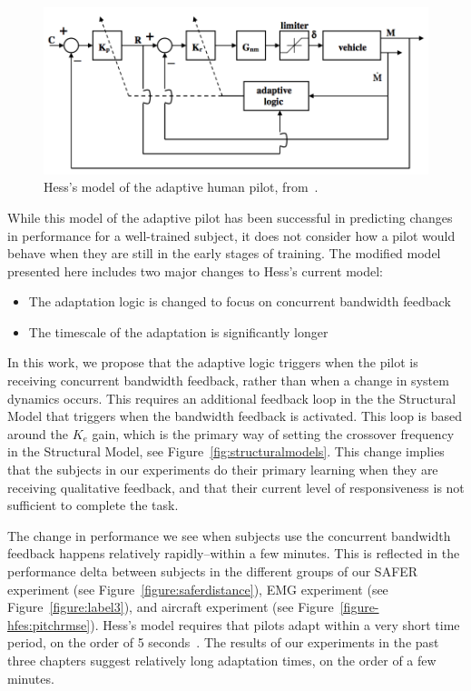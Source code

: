 \begin{figure}[tb]
    \begin{center}
        \includegraphics[width=0.8\linewidth]{figures/Modeling/Screen_Shot_2018-08-09_at_4_15_24_PM.png}
        \caption[Hess's model of the adaptive human pilot]{Hess's model of the adaptive human pilot, from~\citet{hess_modeling_2009}.}
        \label{figure:hesspursuit}
    \end{center}
\end{figure}

While this model of the adaptive pilot has been successful in predicting changes in performance for a well-trained subject, it does not consider how a pilot would behave when they are still in the early stages of training.
The modified model presented here includes two major changes to Hess's current model:
\begin{itemize}
    \item The adaptation logic is changed to focus on concurrent bandwidth feedback
    \item The timescale of the adaptation is significantly longer
\end{itemize}

In this work, we propose that the adaptive logic triggers when the pilot is receiving concurrent bandwidth feedback, rather than when a change in system dynamics occurs.
This requires an additional feedback loop in the the Structural Model that triggers when the bandwidth feedback is activated.
This loop is based around the $K_e$ gain, which is the primary way of setting the crossover frequency in the Structural Model, see Figure~\ref{fig:structuralmodels}.
This change implies that the subjects in our experiments do their primary learning when they are receiving qualitative feedback, and that their current level of responsiveness is not sufficient to complete the task.

The change in performance we see when subjects use the concurrent bandwidth feedback happens relatively rapidly--within a few minutes.
This is reflected in the performance delta between subjects in the different groups of our SAFER experiment (see Figure~\ref{figure:saferdistance}), EMG experiment (see Figure~\ref{figure:label3}), and aircraft experiment (see Figure~\ref{figure-hfes:pitchrmse}).
Hess's model requires that pilots adapt within a very short time period, on the order of 5 seconds~\citep{weir_model_1966}.
The results of our experiments in the past three chapters suggest relatively long adaptation times, on the order of a few minutes.

